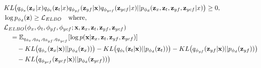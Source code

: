 \documentclass{amia}
\begin{document}
\begin{align}
 & KL\big(q_{\phi_x}(\textbf{z}_x|x)q_{\phi_t}(\textbf{z}_t|x)q_{\phi_{yf}}(\textbf{z}_{yf}|\textbf{x})q_{\phi_{ycf}}(\textbf{z}_{ycf}|x)||
 p_{\phi_d}(\textbf{z}_x, \textbf{z}_t, \textbf{z}_{yf}, \textbf{z}_{ycf}|x)\big) \geq 0, \nonumber\\
&\log p_{\phi_d}(\textbf{z}) \geq \mathcal{L}_{ELBO} \quad \text{where,} \nonumber\\ 
 &\mathcal{L}_{ELBO}(\phi_x, \phi_t, \phi_{yf}, \phi_{ycf}; \textbf{x}, \textbf{z}_x, \textbf{z}_t, \textbf{z}_{yf}, \textbf{z}_{ycf}) \nonumber\\
&\quad= \mathbb{E}_{q_{\phi_x}, q_{\phi_t}, q_{\phi_{yf}}, q_{\phi_{ycf}}}[\log p(\textbf{\textbf{x}}|\textbf{z}_x, \textbf{z}_t, \textbf{z}_{yf}, \textbf{z}_{ycf})]
\nonumber\\
 &\qquad -KL\big(q_{\phi_x}(\textbf{z}_x|\textbf{x}) || p_{\phi_d}(\textbf{z}_x))\big) - KL\big(q_{\phi_t}(\textbf{z}_t|\textbf{x}) || p_{\phi_d}(\textbf{z}_t))\big) \nonumber - KL\big(q_{\phi_{yf}}(\textbf{z}_{yf}|\textbf{x}) || p_{\phi_d}(\textbf{z}_{yf}))\big) \nonumber\\
     &\qquad - KL\big(q_{\phi_{ycf}}(\textbf{z}_{ycf}|\textbf{x}) || p_{\phi_d}(\textbf{z}_{ycf}))\big) \nonumber
\end{align}
\end{document}
